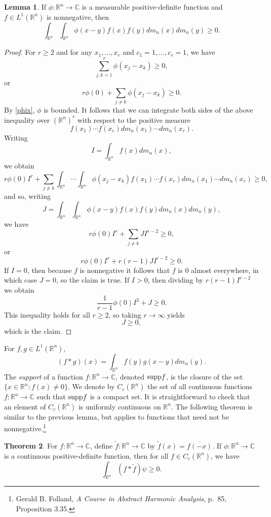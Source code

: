 \documentclass{article}
\newcommand{\supp}{\ensuremath\mathrm{supp}}
\theoremstyle{definition}
\newtheorem{theorem}{Theorem}
\newtheorem{lemma}[theorem]{Lemma}
\theoremstyle{definition}
\begin{document}
\begin{lemma}
If $\phi:\mathbb{R}^n \to \mathbb{C}$ is a measurable positive-definite function and $f \in L^1(\mathbb{R}^n)$ is nonnegative, then
\[
\int_{\mathbb{R}^n} \int_{\mathbb{R}^n} \phi(x-y) f(x)f(y)dm_n(x)dm_n(y) \geq 0.
\]
\label{rlemma}
\end{lemma}
\begin{proof}
For  $r \geq 2$ and for any $x_1,\ldots,x_r$ and  $c_1=1,\ldots,c_r=1$, we have
\[
\sum_{j,k=1}^r \phi(x_j-x_k) \geq 0,
\]
or
\[
r\phi(0) + \sum_{j \neq k} \phi(x_j-x_k) \geq 0.
\]
By \eqref{phix}, $\phi$ is bounded. It follows that we can integrate both sides of the above inequality over $(\mathbb{R}^n)^r$ with respect to the positive measure
\[
f(x_1)\cdots f(x_r) dm_n(x_1) \cdots dm_n(x_r).
\]
 Writing 
\[
I=\int_{\mathbb{R}^n} f(x) dm_n(x),
\]
we obtain
\[
r\phi(0) I^r  + \sum_{j \neq k} \int_{\mathbb{R}^n} \cdots \int_{\mathbb{R}^n} \phi(x_j-x_k) f(x_1)\cdots
f(x_r) dm_n(x_1)\cdots dm_n(x_r) \geq 0,
\]
and so, writing
\[
J=\int_{\mathbb{R}^n} \int_{\mathbb{R}^n} \phi(x-y) f(x)f(y) dm_n(x)dm_n(y),
\]
we have
\[
r\phi(0)I^r +\sum_{j \neq k} JI^{r-2} \geq 0,
\]
or
\[
r\phi(0)I^r +r(r-1) JI^{r-2} \geq 0.
\]
If $I=0$, then because $f$ is nonnegative it follows that $f$ is $0$ almost everywhere, in which case $J=0$, so the claim is true. If $I>0$, then dividing by $r(r-1) I^{r-2}$ we obtain
\[
\frac{1}{r-1} \phi(0)I^2 +J \geq 0.
\]
This inequality holds for all $r \geq 2$, so taking $r \to \infty$ yields
\[
J \geq 0,
\]
which is the claim.
\end{proof}

For $f,g \in L^1(\mathbb{R}^n)$,
\[
(f*g)(x) = \int_{\mathbb{R}^n} f(y)g(x-y) dm_n(y).
\]
The {\em support} of a function $f:\mathbb{R}^n \to \mathbb{C}$, denoted $\supp f$, is the closure of the set $\{x \in \mathbb{R}^n: f(x) \neq 0\}$.
We denote by $C_c(\mathbb{R}^n)$ the set of all continuous functions $f:\mathbb{R}^n \to \mathbb{C}$ such that
$\supp f$ is a compact set. It is straightforward to check that an element of $C_c(\mathbb{R}^n)$ is uniformly continuous on
$\mathbb{R}^n$. The following theorem is similar to the previous lemma, but applies to functions that need not be
nonnegative.\footnote{Gerald B. Folland, {\em A Course in Abstract Harmonic Analysis}, p.~85, Proposition 3.35.}

\begin{theorem}
For $f:\mathbb{R}^n \to \mathbb{C}$, define $\widetilde{f}:\mathbb{R}^n \to \mathbb{C}$ by $\widetilde{f}(x)=\overline{f(-x)}$. 
If $\phi:\mathbb{R}^n \to \mathbb{C}$ is a continuous positive-definite function, then for all $f \in C_c(\mathbb{R}^n)$, we have
\[
\int_{\mathbb{R}^n} (f*\widetilde{f})\psi \geq 0.
\]
\label{integralinequality}
\end{theorem}
\end{document}
